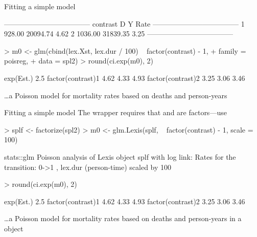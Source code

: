 \begin{frame}[fragile]{Fitting a simple model}
\begin{Schunk}
\begin{Soutput}
 ------------------------------------ 
 contrast         D        Y    Rate  
 ------------------------------------ 
 1           928.00 20094.74    4.62  
 2          1036.00 31839.35    3.25  
 ------------------------------------ 
\end{Soutput}
\end{Schunk}
\begin{Schunk}
\begin{Sinput}
> m0 <- glm(cbind(lex.Xst, lex.dur / 100) ~ factor(contrast) - 1,
+           family = poisreg,
+             data = spl2)
> round(ci.exp(m0), 2)
\end{Sinput}
\begin{Soutput}
                  exp(Est.) 2.5%
factor(contrast)1      4.62 4.33  4.93
factor(contrast)2      3.25 3.06  3.46
\end{Soutput}
\end{Schunk}
\small
\ldots a Poisson model for mortality rates based on deaths and person-years
\end{frame}

\begin{frame}[fragile]{Fitting a simple model}
The wrapper  requires that  and 
are factors---use 
\begin{Schunk}
\begin{Sinput}
> splf <- factorize(spl2)
> m0 <- glm.Lexis(splf, ~ factor(contrast) - 1, scale = 100)
\end{Sinput}
\begin{Soutput}
stats::glm Poisson analysis of Lexis object splf with log link:
Rates for the transition:
0->1
, lex.dur (person-time) scaled by 100
\end{Soutput}
\begin{Sinput}
> round(ci.exp(m0), 2)
\end{Sinput}
\begin{Soutput}
                  exp(Est.) 2.5%
factor(contrast)1      4.62 4.33  4.93
factor(contrast)2      3.25 3.06  3.46
\end{Soutput}
\end{Schunk}
\small
\ldots a Poisson model for mortality rates based on deaths and
person-years in a  object
\end{frame}

